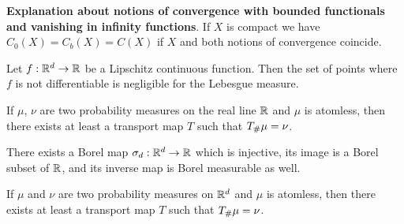 \begin{definition}
		
\end{definition}


\textbf{Explanation about notions of convergence with bounded functionals and vanishing in infinity functions}. If $X$ is compact we have $C_0(X)=C_b(X)=C(X)$ if $X$ and both notions of convergence coincide.



\begin{theorem}[Rademacher]
	Let $f:\mathbb{R}^d\rightarrow\mathbb{R}$ be a Lipschitz continuous function. Then the set of points where $f$ is not differentiable is negligible for the Lebesgue measure.
\end{theorem}


\begin{lemma}
If $\mu$, $\nu$ are two probability measures on the real line $\mathbb{R}$ and $\mu$ is atomless, then there exists at least a transport map $T$ such that ${T}_{\#} \mu=\nu$.
\end{lemma}

\begin{lemma}
There exists a Borel map $\sigma_d: \mathbb{R}^d\rightarrow \mathbb{R}$ which is injective, its image is a Borel subset of $\mathbb{R}$, and its inverse map is Borel measurable as well.
\end{lemma}

\begin{theorem}
If $\mu$ and $\nu$ are two probability measures on $\mathbb{R}^d$ and $\mu$ is atomless, then there exists at least a transport map $T$ such that ${T}_{\#} \mu=\nu$.
\end{theorem}
